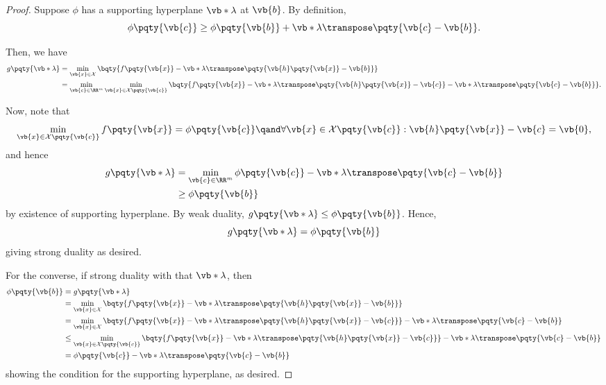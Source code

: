 \begin{proof}
    Suppose \(\phi\) has a supporting hyperplane \(\vb*{\lambda}\) at \(\vb{b}\). By definition,
    \[
        \phi\pqty{\vb{c}} \geq \phi\pqty{\vb{b}} + \vb*{\lambda}\transpose \pqty{\vb{c} - \vb{b}}.
    \]

    Then, we have
    \begin{align*}
        g\pqty{\vb*{\lambda}} &= \min_{\vb{x} \in \mathcal{X}} \bqty{f\pqty{\vb{x}} - \vb*{\lambda}\transpose \pqty{\vb{h}\pqty{\vb{x}} - \vb{b}}} \\
        &= \min_{\vb{c} \in \RR^m} \min_{\vb{x} \in \mathcal{X}\pqty{\vb{c}}} \bqty{f\pqty{\vb{x}} - \vb*{\lambda}\transpose \pqty{\vb{h}\pqty{\vb{x}} - \vb{c}} - \vb*{\lambda}\transpose \pqty{\vb{c} - \vb{b}}}.
    \end{align*}

    Now, note that
    \[
        \min_{\vb{x} \in \mathcal{X} \pqty{\vb{c}}} f\pqty{\vb{x}} = \phi\pqty{\vb{c}} \qand \forall \vb{x} \in \mathcal{X}\pqty{\vb{c}}: \vb{h}\pqty{\vb{x}} - \vb{c} = \vb{0},
    \]
    and hence
    \begin{align*}
         g\pqty{\vb*{\lambda}} &= \min_{\vb{c} \in \RR^m} \phi\pqty{\vb{c}} - \vb*{\lambda}\transpose \pqty{\vb{c} - \vb{b}} \\
         &\geq \phi\pqty{\vb{b}}
    \end{align*}
    by existence of supporting hyperplane. By weak duality, \(g\pqty{\vb*{\lambda}} \leq \phi\pqty{\vb{b}}\). Hence,
    \[
        g\pqty{\vb*{\lambda}} = \phi\pqty{\vb{b}}
    \]
    giving strong duality as desired.

    For the converse, if strong duality with that \(\vb*{\lambda}\), then
    \begin{align*}
        \phi\pqty{\vb{b}} &= g\pqty{\vb*{\lambda}} \\
        &= \min_{\vb{x} \in \mathcal{X}} \bqty{f\pqty{\vb{x}} - \vb*{\lambda}\transpose \pqty{\vb{h}\pqty{\vb{x}} - \vb{b}}} \\
        &= \min_{\vb{x} \in \mathcal{X}} \bqty{f\pqty{\vb{x}} - \vb*{\lambda}\transpose \pqty{\vb{h}\pqty{\vb{x}} - \vb{c}}} - \vb*{\lambda}\transpose \pqty{\vb{c} - \vb{b}} \\
        &\leq \min_{\vb{x} \in \mathcal{X}\pqty{\vb{c}}} \bqty{f\pqty{\vb{x}} - \vb*{\lambda}\transpose \pqty{\vb{h}\pqty{\vb{x}} - \vb{c}}} - \vb*{\lambda}\transpose \pqty{\vb{c} - \vb{b}} \\
        &= \phi\pqty{\vb{c}} - \vb*{\lambda}\transpose \pqty{\vb{c} - \vb{b}}
    \end{align*}
    showing the condition for the supporting hyperplane, as desired.
\end{proof}


